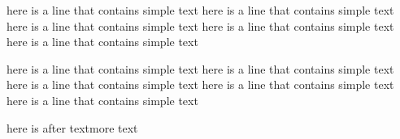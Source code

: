 here is a line that contains simple text here is a line that contains
simple text here is a line that contains simple text here is a line that
contains simple text here is a line that contains simple text %

here is a line that contains simple text here is a line that contains
simple text here is a line that contains simple text here is a line that
contains simple text here is a line that contains simple text%

here is after textmore text%
